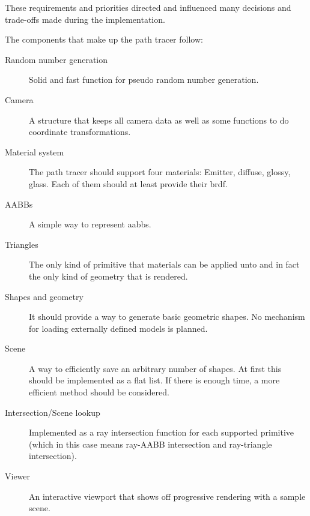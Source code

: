 \documentclass[
  twoside,
  11pt, a4paper,
  footinclude=true,
  headinclude=true,
  cleardoublepage=empty
]{scrreprt}
\begin{document}
These requirements and priorities directed and
influenced many decisions and trade-offs made during the implementation.

\begin{minipage}{\textwidth}
    The components that make up the path tracer follow:

    \begin{description}
        \item[Random number generation] Solid and fast function for pseudo random number generation.
        \item[Camera] A structure that keeps all camera data as well as some functions to do coordinate
            transformations.
        \item[Material system] The path tracer should support four materials: Emitter, diffuse, glossy,
            glass. Each of them should at least provide their \ac{brdf}.
        \item[AABBs] A simple way to represent \acp{aabb}.
        \item[Triangles] The only kind of primitive that materials can be applied unto and in fact the
            only kind of geometry that is rendered.
        \item[Shapes and geometry] It should provide a way to generate basic geometric shapes. No
            mechanism for loading externally defined models is planned.
        \item[Scene] A way to efficiently save an arbitrary number of shapes. At first this should be
            implemented as a flat list. If there is enough time, a more efficient method should be
            considered.
        \item[Intersection/Scene lookup] Implemented as a ray intersection function for each supported primitive
            (which in this case means ray-AABB intersection and ray-triangle intersection).
        \item[Viewer] An interactive viewport that shows off progressive rendering with a sample scene.
    \end{description}
\end{minipage}
\end{document}
